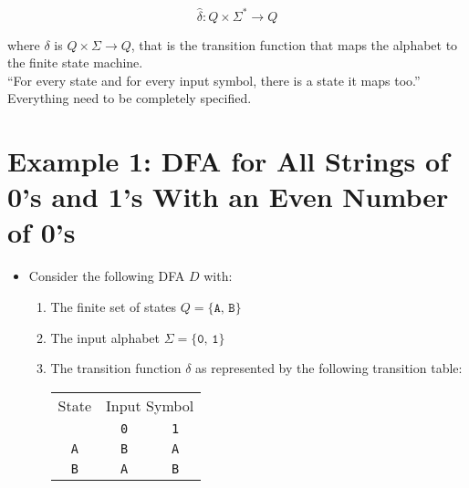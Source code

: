 \documentclass[]{article}
\begin{document}
    \[ \hat{\delta}: Q \times \Sigma^* \rightarrow Q \]

  where $\delta$ is $Q \times \Sigma \rightarrow Q$, that is the transition
  function that maps the alphabet to the finite state machine. \\
  \indent ``For every state and for every input symbol, there is a state it
  maps too.'' Everything need to be completely specified.

\section{Example 1: DFA for All Strings of 0's and 1's With an Even Number of
0's}
  \begin{itemize}
    \item Consider the following DFA $D$ with:
      \begin{enumerate}
        \item The finite set of states $Q = \{ \texttt{A, B} \}$
        \item The input alphabet $\Sigma = \{ \texttt{0, 1} \}$
        \item The transition function $\delta$ as represented by the following
        transition table:

          \begin{tabular}{|c|c|c|}
            \hline
            State & \multicolumn{2}{|c|}{Input Symbol} \\ \cline{2-3}
                  & \texttt{0} & \texttt{1} \\ \hline
            \texttt{A} & \texttt{B} & \texttt{A} \\ \hline
            \texttt{B} & \texttt{A} & \texttt{B} \\ \hline
          \end{tabular}


\end{enumerate}
\end{itemize}
\end{document}
